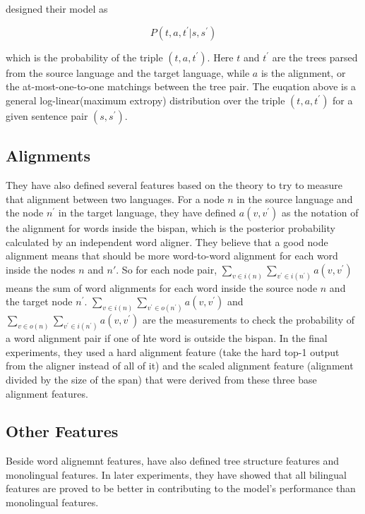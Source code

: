 \documentclass[11pt]{article} %
\begin{document}
\cite{Burkett:2008:TLB:1613715.1613828} designed their model as

\begin{equation}
    P(t, a, t^\prime|s, s^\prime)
\end{equation}

which is the probability of the triple $(t, a, t^\prime)$. Here $t$ and $t^\prime$ are the trees parsed from the source language and the target language, while $a$ is the alignment, or the at-most-one-to-one matchings between the tree pair. The euqation above is a general log-linear(maximum extropy) distribution over the triple $(t, a, t^\prime)$ for a given sentence pair $(s, s^\prime)$.

\subsection{Alignments}

They have also defined several features based on the theory to try to measure that alignment between two languages. For a node $n$ in the source language and the node $n^\prime$ in the target language, they have defined $a(v, v^\prime)$ as the notation of the alignment for words inside the bispan, which is the posterior probability calculated by an independent word aligner. They believe that a good node alignment means that should be more word-to-word alignment for each word inside the nodes $n$ and $n\prime$. So for each node pair, $\sum_{v\in i(n)}\sum_{v^\prime\in i(n^\prime)}a(v, v^\prime)$ means the sum of word alignments for each word inside the source node $n$ and the target node $n^\prime$. $\sum_{v\in i(n)}\sum_{v^\prime\in o(n^\prime)}a(v, v^\prime)$ and $\sum_{v\in o(n)}\sum_{v^\prime\in i(n^\prime)}a(v, v^\prime)$ are the measurements to check the probability of a word alignment pair if one of hte word is outside the bispan. In the final experiments, they used a hard alignment feature (take the hard top-1 output from the aligner instead of all of it) and the scaled alignment feature (alignment divided by the size of the span) that were derived from these three base alignment features.

\subsection{Other Features}

Beside word alignemnt features, \cite{Burkett:2008:TLB:1613715.1613828} have also defined tree structure features and monolingual features. In later experiments, they have showed that all bilingual features are proved to be better in contributing to the model's performance than monolingual features.
\end{document}

